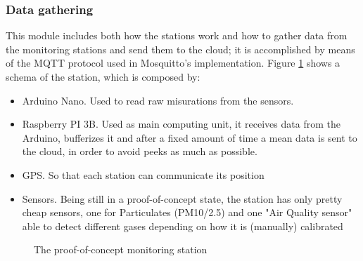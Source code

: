 \documentclass[11pt,a4paper,titlepage]{book}
\begin{document}
\subsubsection{Data gathering}
This module includes both how the stations work and how to gather data from the monitoring stations and send them to the cloud; it is accomplished by means of the MQTT protocol used in Mosquitto's implementation.
\newline
\newline
Figure \ref{cleanair_station} shows a schema of the station, which is composed by:
\begin{itemize}
    \item Arduino Nano. Used to read raw misurations from the sensors.
    \item Raspberry PI 3B. Used as main computing unit, it receives data from the Arduino, bufferizes it and after a fixed amount of time a mean data is sent to the cloud, in order to avoid peeks as much as possible.
    \item GPS. So that each station can communicate its position
    \item Sensors. Being still in a proof-of-concept state, the station has only pretty cheap sensors, one for Particulates (PM10/2.5) and one "Air Quality sensor" able to detect different gases depending on how it is (manually) calibrated
\end{itemize}
\begin{figure}[ht]
    \centering
    
    \caption{The proof-of-concept monitoring station}
    \label{cleanair_station}
\end{figure}
\end{document}

